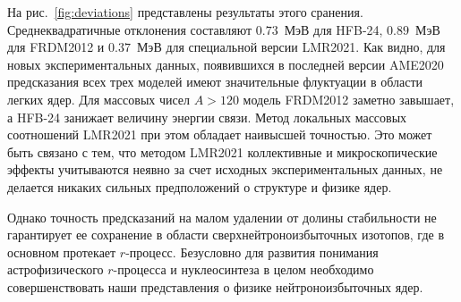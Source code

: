 На рис.~\ref{fig:deviations} представлены результаты этого сранения. Среднеквадратичные отклонения составляют $0.73$~МэВ для HFB-24, $0.89$~МэВ для FRDM2012 и $0.37$~МэВ для специальной версии LMR2021. Как видно, для новых экспериментальных данных, появившихся в последней версии AME2020
предсказания всех трех моделей имеют значительные флуктуации в области легких ядер. Для массовых чисел $A > 120$ модель FRDM2012 заметно завышает, а HFB-24 занижает величину энергии связи. Метод локальных массовых соотношений LMR2021 при этом обладает наивысшей точностью. Это может быть связано с тем, что методом LMR2021 коллективные и микроскопические эффекты учитываются неявно за счет исходных экспериментальных данных, не делается никаких сильных предположений о структуре и физике ядер. 

Однако точность предсказаний на малом удалении от долины стабильности не гарантирует ее сохранение в области сверхнейтроноизбыточных изотопов, где в основном протекает $r$-процесс. Безусловно для развития понимания астрофизического $r$-процесса и нуклеосинтеза в целом необходимо совершенствовать наши представления о физике нейтроноизбыточных ядер.

